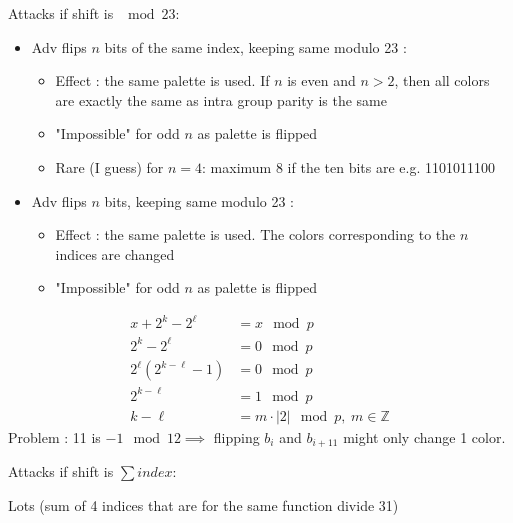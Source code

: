 \documentclass{article}
\begin{document}
Attacks if shift is $\mod 23$:
\begin{itemize}
    \item Adv flips $n$ bits of the same index, keeping same modulo 23 :
    \begin{itemize}
        \item Effect : the same palette is used. If $n$ is even and $n > 2$, then all colors are exactly the same as intra group parity is the same
        \item "Impossible" for odd $n$ as palette is flipped
        \item Rare (I guess) for $n = 4$: maximum 8 if the ten bits are e.g. 1101011100
    \end{itemize}
    \item Adv flips $n$ bits, keeping same modulo 23 :
    \begin{itemize}
        \item Effect : the same palette is used. The colors corresponding to the $n$ indices are changed
        \item "Impossible" for odd $n$ as palette is flipped
    \end{itemize}
\end{itemize}

\vspace{8pt}
\begin{align*}
	x + 2^k - 2^\ell &= x \mod p\\
	2^k - 2^\ell &= 0 \mod p\\
	2^\ell \left(2^{k - \ell} - 1 \right) &= 0 \mod p\\
	2^{k-\ell} &= 1 \mod p\\
	k - \ell &= m \cdot |2|\mod p, \hspace{3pt} m \in \mathbb Z
\end{align*}
Problem : 11 is $-1 \mod 12 \implies$ flipping $b_i$ and $b_{i+11}$ might only change 1 color.

Attacks if shift is $\sum index$:

Lots (sum of 4 indices that are for the same function divide 31)

\end{document}

